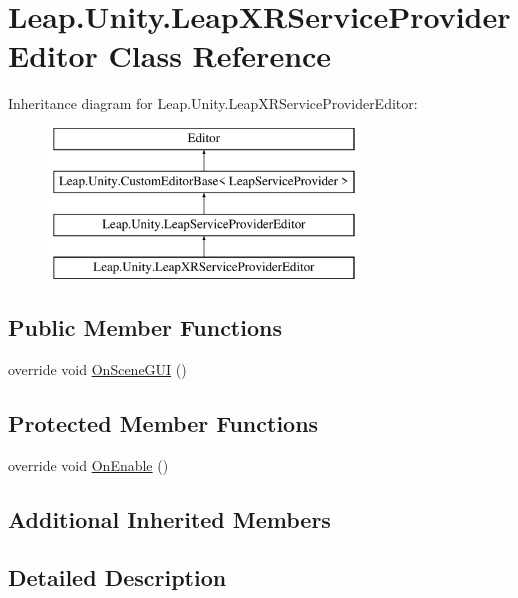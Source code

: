 \hypertarget{class_leap_1_1_unity_1_1_leap_x_r_service_provider_editor}{}\section{Leap.\+Unity.\+Leap\+X\+R\+Service\+Provider\+Editor Class Reference}
\label{class_leap_1_1_unity_1_1_leap_x_r_service_provider_editor}
Inheritance diagram for Leap.\+Unity.\+Leap\+X\+R\+Service\+Provider\+Editor\+:\begin{figure}[H]
\begin{center}
\leavevmode
\includegraphics[height=4.000000cm]{class_leap_1_1_unity_1_1_leap_x_r_service_provider_editor}
\end{center}
\end{figure}
\subsection*{Public Member Functions}
\begin{DoxyCompactItemize}
\item 
override void \mbox{\hyperlink{class_leap_1_1_unity_1_1_leap_x_r_service_provider_editor_af109f9fa67a87b0802b3a55f291726ba}{On\+Scene\+G\+UI}} ()
\end{DoxyCompactItemize}
\subsection*{Protected Member Functions}
\begin{DoxyCompactItemize}
\item 
override void \mbox{\hyperlink{class_leap_1_1_unity_1_1_leap_x_r_service_provider_editor_af1b2b20f9a7da319b8c6b5b8b95f9e9c}{On\+Enable}} ()
\end{DoxyCompactItemize}
\subsection*{Additional Inherited Members}


\subsection{Detailed Description}


